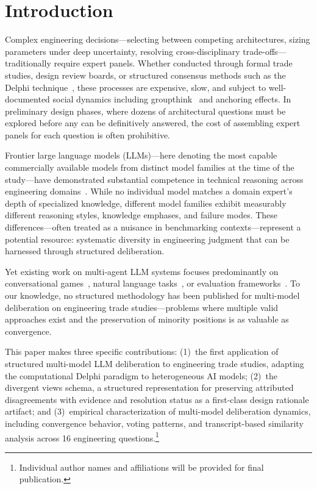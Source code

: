 \documentclass[11pt,a4paper]{article}
\begin{document}
\onehalfspacing

\section{Introduction}
\label{sec:introduction}

Complex engineering decisions---selecting between competing architectures, sizing parameters under deep uncertainty, resolving cross-disciplinary trade-offs---traditionally require expert panels. Whether conducted through formal trade studies, design review boards, or structured consensus methods such as the Delphi technique~\cite{linstone1975delphi}, these processes are expensive, slow, and subject to well-documented social dynamics including groupthink~\cite{janis1982groupthink} and anchoring effects. In preliminary design phases, where dozens of architectural questions must be explored before any can be definitively answered, the cost of assembling expert panels for each question is often prohibitive.

Frontier large language models (LLMs)---here denoting the most capable commercially available models from distinct model families at the time of the study---have demonstrated substantial competence in technical reasoning across engineering domains~\cite{bubeck2023sparks,openai2024gpt4}. While no individual model matches a domain expert's depth of specialized knowledge, different model families exhibit measurably different reasoning styles, knowledge emphases, and failure modes. These differences---often treated as a nuisance in benchmarking contexts---represent a potential resource: systematic diversity in engineering judgment that can be harnessed through structured deliberation.

Yet existing work on multi-agent LLM systems focuses predominantly on conversational games~\cite{du2023debate}, natural language tasks~\cite{wu2023autogen}, or evaluation frameworks~\cite{zheng2024judging}. To our knowledge, no structured methodology has been published for multi-model deliberation on engineering trade studies---problems where multiple valid approaches exist and the preservation of minority positions is as valuable as convergence.

This paper makes three specific contributions: (1)~the first application of structured multi-model LLM deliberation to engineering trade studies, adapting the computational Delphi paradigm to heterogeneous AI models; (2)~the divergent views schema, a structured representation for preserving attributed disagreements with evidence and resolution status as a first-class design rationale artifact; and (3)~empirical characterization of multi-model deliberation dynamics, including convergence behavior, voting patterns, and transcript-based similarity analysis across 16 engineering questions.\footnote{Individual author names and affiliations will be provided for final publication.}
\end{document}
